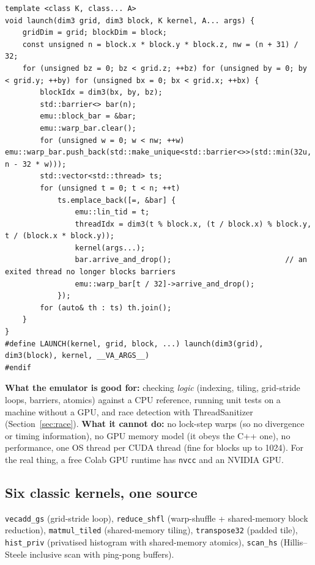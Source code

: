 \documentclass[10pt,a4paper,openany,oneside]{report}
\begin{document}
\begin{lstlisting}[language={[11]C++},basicstyle=\ttfamily\scriptsize,title={cuda\_dual.h (CPU emulation + device-only stub)}]
template <class K, class... A>
void launch(dim3 grid, dim3 block, K kernel, A... args) {
    gridDim = grid; blockDim = block;
    const unsigned n = block.x * block.y * block.z, nw = (n + 31) / 32;
    for (unsigned bz = 0; bz < grid.z; ++bz) for (unsigned by = 0; by < grid.y; ++by) for (unsigned bx = 0; bx < grid.x; ++bx) {
        blockIdx = dim3(bx, by, bz);
        std::barrier<> bar(n);
        emu::block_bar = &bar;
        emu::warp_bar.clear();
        for (unsigned w = 0; w < nw; ++w) emu::warp_bar.push_back(std::make_unique<std::barrier<>>(std::min(32u, n - 32 * w)));
        std::vector<std::thread> ts;
        for (unsigned t = 0; t < n; ++t)
            ts.emplace_back([=, &bar] {
                emu::lin_tid = t;
                threadIdx = dim3(t % block.x, (t / block.x) % block.y, t / (block.x * block.y));
                kernel(args...);
                bar.arrive_and_drop();                          // an exited thread no longer blocks barriers
                emu::warp_bar[t / 32]->arrive_and_drop();
            });
        for (auto& th : ts) th.join();
    }
}
#define LAUNCH(kernel, grid, block, ...) launch(dim3(grid), dim3(block), kernel, __VA_ARGS__)
#endif
\end{lstlisting}

\textbf{What the emulator is good for:} checking \emph{logic} (indexing, tiling, grid-stride loops, barriers, atomics) against a CPU reference, running unit tests on a machine without a GPU, and race detection with ThreadSanitizer (Section~\ref{sec:race}). \textbf{What it cannot do:} no lock-step warps (so no divergence or timing information), no GPU memory model (it obeys the C++ one), no performance, one OS thread per CUDA thread (fine for blocks up to 1024). For the real thing, a free Colab GPU runtime has \texttt{nvcc} and an NVIDIA GPU.

\subsection{Six classic kernels, one source}
\texttt{vecadd\_gs} (grid-stride loop), \texttt{reduce\_shfl} (warp-shuffle + shared-memory block reduction), \texttt{matmul\_tiled} (shared-memory tiling), \texttt{transpose32} (padded tile), \texttt{hist\_priv} (privatised histogram with shared-memory atomics), \texttt{scan\_hs} (Hillis--Steele inclusive scan with ping-pong buffers).
\end{document}
